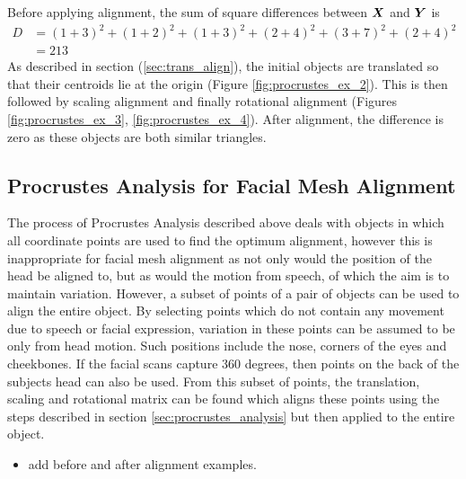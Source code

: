 \documentclass[12pt]{report}
\begin{document}
Before applying alignment, the sum of square differences between ${\boldsymbol{{X}}}$ and ${\boldsymbol{{Y}}}$ is
\begin{align*}
    D& = {(1+3)^2 + (1+2)^2} + {(1+3)^2 + (2+4)^2} + {(3+7)^2 + (2+4)^2} \\
     & = 213
\end{align*}
As described in section (\ref{sec:trans_align}), the initial objects are translated so that their centroids lie at the origin (Figure \ref{fig:procrustes_ex_2}). This is then followed by scaling alignment and finally rotational alignment (Figures \ref{fig:procrustes_ex_3}, \ref{fig:procrustes_ex_4}).
After alignment, the difference is zero as these objects are both similar triangles.

\subsection{Procrustes Analysis for Facial Mesh Alignment}
The process of Procrustes Analysis described above deals with objects in which all coordinate points are used to find the optimum alignment, however this is inappropriate for facial mesh alignment as not only would the position of the head be aligned to, but as would the motion from speech, of which the aim is to maintain variation.
However, a subset of points of a pair of objects can be used to align the entire object.
By selecting points which do not contain any movement due to speech or facial expression, variation in these points can be assumed to be only from head motion.
Such positions include the nose, corners of the eyes and cheekbones.
If the facial scans capture 360 degrees, then points on the back of the subjects head can also be used.
From this subset of points, the translation, scaling and rotational matrix can be found which aligns these points using the steps described in section \ref{sec:procrustes_analysis} but then applied to the entire object.

\begin{itemize}
    \item add before and after alignment examples.
\end{itemize}



\end{document}
